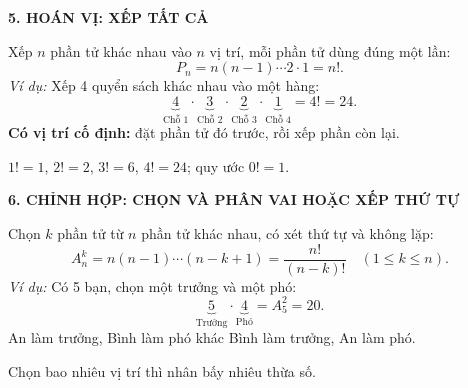 \documentclass[12pt, a4paper]{article}
\begin{document}


\newpage

\begin{theorybox}
\textbf{5. HOÁN VỊ: XẾP TẤT CẢ}

\noindent Xếp $n$ phần tử khác nhau vào $n$ vị trí, mỗi phần tử dùng đúng một lần:
\[
\boxed{P_n=n(n-1)\cdots2\cdot1=n!}.
\]
\noindent\textit{Ví dụ:} Xếp 4 quyển sách khác nhau vào một hàng:
\[
\underbrace{4}_{\text{Chỗ 1}}\cdot\underbrace{3}_{\text{Chỗ 2}}\cdot
\underbrace{2}_{\text{Chỗ 3}}\cdot\underbrace{1}_{\text{Chỗ 4}}=4!=24.
\]
\noindent\textbf{Có vị trí cố định:} đặt phần tử đó trước, rồi xếp phần còn lại.\par
\smallskip
\centering $1!=1$, $2!=2$, $3!=6$, $4!=24$; quy ước $0!=1$.
\end{theorybox}



\newpage

\begin{theorybox}
\textbf{6. CHỈNH HỢP: CHỌN VÀ PHÂN VAI HOẶC XẾP THỨ TỰ}

\noindent Chọn $k$ phần tử từ $n$ phần tử khác nhau, có xét thứ tự và không lặp:
\[
\boxed{A_n^k=n(n-1)\cdots(n-k+1)=\frac{n!}{(n-k)!}}\quad(1\le k\le n).
\]
\noindent\textit{Ví dụ:} Có 5 bạn, chọn một trưởng và một phó:
\[
\underbrace{5}_{\text{Trưởng}}\cdot\underbrace{4}_{\text{Phó}}=A_5^2=20.
\]
\centering An làm trưởng, Bình làm phó khác Bình làm trưởng, An làm phó.\par
\smallskip
\centering Chọn bao nhiêu vị trí thì nhân bấy nhiêu thừa số.
\end{theorybox}
\end{document}
